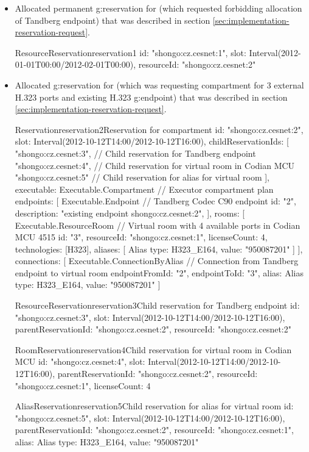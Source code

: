 \begin{itemize}
\item Allocated permanent \gls{g:reservation} for \hyperref[oc:request1]{} (which requested forbidding allocation of Tandberg endpoint) that was described in section \ref{sec:implementation-reservation-request}.
\begin{ObjectCode}{ResourceReservation}{reservation1}{}
id: "shongo:cz.cesnet:1",
slot: Interval(2012-01-01T00:00/2012-02-01T00:00),
resourceId: "shongo:cz.cesnet:2"
\end{ObjectCode}

\item Allocated \gls{g:reservation} for \hyperref[oc:request2]{} (which was requesting compartment for 3 external H.323 ports and existing H.323 \gls{g:endpoint}) that was described in section \ref{sec:implementation-reservation-request}.
\begin{ObjectCode}{Reservation}{reservation2}{Reservation for compartment}
id: "shongo:cz.cesnet:2",
slot: Interval(2012-10-12T14:00/2012-10-12T16:00),
childReservationIds: [
  "shongo:cz.cesnet:3", // Child reservation for Tandberg endpoint 
  "shongo:cz.cesnet:4", // Child reservation for virtual room in Codian MCU
  "shongo:cz.cesnet:5"  // Child reservation for alias for virtual room
],
executable: Executable.Compartment { // Executor compartment plan
  endpoints: [
    Executable.Endpoint { // Tandberg Codec C90 endpoint
      id: "2",
      description: "existing endpoint shongo:cz.cesnet:2",      
    }
  ],
  rooms: [
    Executable.ResourceRoom { // Virtual room with 4 available ports in Codian MCU 4515
      id: "3",
      resourceId: "shongo:cz.cesnet:1",
      licenseCount: 4,
      technologies: [H323],
      aliases: [
        Alias { type: H323_E164, value: "950087201" }
      ]
    }
  ],
  connections: [
    Executable.ConnectionByAlias { // Connection from Tandberg endpoint to virtual room
      endpointFromId: "2", 
      endpointToId: "3",
      alias: Alias { type: H323_E164, value: "950087201" }
    }
  ]
}
\end{ObjectCode}
\begin{ObjectCode}{ResourceReservation}{reservation3}{Child reservation for Tandberg endpoint}
id: "shongo:cz.cesnet:3",
slot: Interval(2012-10-12T14:00/2012-10-12T16:00),
parentReservationId: "shongo:cz.cesnet:2",
resourceId: "shongo:cz.cesnet:2"
\end{ObjectCode}
\begin{ObjectCode}{RoomReservation}{reservation4}{Child reservation for virtual room in Codian MCU}
id: "shongo:cz.cesnet:4",
slot: Interval(2012-10-12T14:00/2012-10-12T16:00),
parentReservationId: "shongo:cz.cesnet:2",
resourceId: "shongo:cz.cesnet:1",
licenseCount: 4
\end{ObjectCode}
\begin{ObjectCode}{AliasReservation}{reservation5}{Child reservation for alias for virtual room}
id: "shongo:cz.cesnet:5",
slot: Interval(2012-10-12T14:00/2012-10-12T16:00),
parentReservationId: "shongo:cz.cesnet:2",
resourceId: "shongo:cz.cesnet:1",
alias: Alias { type: H323_E164, value: "950087201" }
\end{ObjectCode}


\end{itemize}
